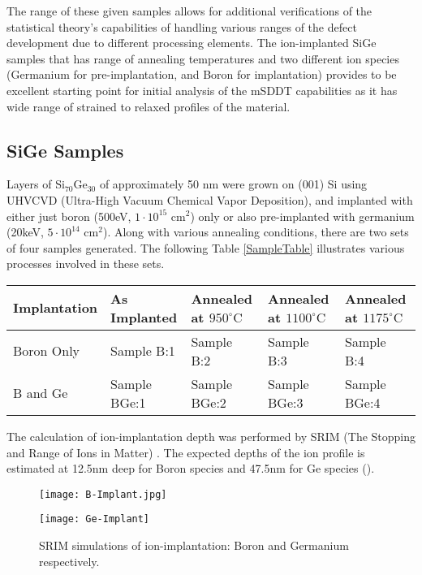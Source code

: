  The range of these given samples allows for additional verifications of the statistical theory's capabilities of handling various ranges of the defect development due to different processing elements.  The ion-implanted SiGe samples that has range of annealing temperatures and two different ion species (Germanium for pre-implantation, and Boron for implantation) provides to be excellent starting point for initial analysis of the mSDDT capabilities as it has wide range of strained to relaxed profiles of the material.  


\subsection{SiGe Samples}

Layers of Si$_{70}$Ge$_{30}$ of approximately 50 nm were grown on (001) Si using UHVCVD (Ultra-High Vacuum Chemical Vapor Deposition), and implanted with either just boron (500eV, $1\cdot 10^{15}$ cm$^2$) only or also pre-implanted with germanium (20keV, $5\cdot 10^{14}$ cm$^2$).  Along with various annealing conditions, there are two sets of four samples generated.  The following Table \ref{SampleTable} illustrates various processes involved in these sets.

\begin{table*}[ht]
  \caption{Processing of the SiGe sample sets}
  \begin{tabular}[htbp]{@{}l|llll@{}}
    \hline
   Implantation & As Implanted & Annealed at $950^{\circ}\mathrm{C}$ & Annealed at $1100^{\circ}\mathrm{C}$ & Annealed at $1175^{\circ}\mathrm{C}$ \\
    \hline
   Boron Only & Sample B:1 & Sample B:2  & Sample B:3 & Sample B:4  \\
   B and Ge & Sample BGe:1 & Sample BGe:2  & Sample BGe:3 & Sample BGe:4  \\
    \hline
  \end{tabular}
  \label{SampleTable}
\end{table*}

The calculation of ion-implantation depth was performed by SRIM (The Stopping and Range of Ions in Matter) \cite{SRIM}.  The expected depths of the ion profile is estimated at 12.5nm deep for Boron species and 47.5nm for Ge species ().
\begin{figure}
\caption{SRIM simulations of ion-implantation:  Boron and Germanium respectively.}
\label{SRIM}
\begin{minipage}{0.5\linewidth}\texttt{[image: B-Implant.jpg]}\end{minipage}\begin{minipage}{0.5\linewidth}
\texttt{[image: Ge-Implant]}\end{minipage}\end{figure}       


